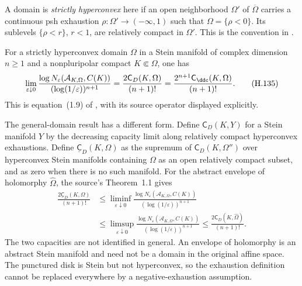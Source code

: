 A domain is \emph{strictly hyperconvex} here if an open
neighborhood $\Omega'$ of $\overline\Omega$ carries a continuous
psh exhaustion $\rho:\Omega'\to(-\infty,1)$ such that
$\Omega=\{\rho<0\}$. Its sublevels $\{\rho<r\}$, $r<1$,
are relatively compact in $\Omega'$. This is the convention in
\cite[Remark~1.2]{Finski26HolomorphicEntropyV1}.

\begin{samepage}
\begin{theorem}\label{thm:appH-holomorphic-entropy}
For a strictly hyperconvex domain $\Omega$ in a Stein manifold
of complex dimension $n\geq1$ and a nonpluripolar compact
$K\Subset\Omega$, one has
\[
 \lim_{\varepsilon\downarrow0}
   \frac{\log N_\varepsilon(\mathcal A_{K,\Omega},C(K))}
        {(\log(1/\varepsilon))^{n+1}}
   =\frac{2\mathsf C_D(K,\Omega)}{(n+1)!}
   =\frac{2^{n+1}\mathsf C_{\ddc}(K,\Omega)}{(n+1)!}.
 \tag{H.135}\label{eq:appH-holomorphic-entropy-limit}
\]
This is equation~(1.9) of
\cite{Finski26HolomorphicEntropyV1}, with its source operator
displayed explicitly.
\end{theorem}
\end{samepage}

The general-domain result has a different form. Define
$\mathsf C_D(K,Y)$ for a Stein manifold $Y$ by the decreasing
capacity limit along relatively compact hyperconvex exhaustions.
Define $\underline{\mathsf C}_D(K,\Omega)$ as the supremum of
$\mathsf C_D(K,\Omega'')$ over hyperconvex Stein manifolds
containing $\Omega$ as an open relatively compact subset, and
as zero when there is no such manifold. For the abstract envelope
of holomorphy $\widehat\Omega$, the source's Theorem~1.1 gives
\[
\begin{aligned}
 \frac{2\underline{\mathsf C}_D(K,\Omega)}{(n+1)!}
 &\leq\liminf_{\varepsilon\downarrow0}
 \frac{\log N_\varepsilon(\mathcal A_{K,\Omega},C(K))}
      {(\log(1/\varepsilon))^{n+1}}\\
 &\leq\limsup_{\varepsilon\downarrow0}
 \frac{\log N_\varepsilon(\mathcal A_{K,\Omega},C(K))}
      {(\log(1/\varepsilon))^{n+1}}
 \leq\frac{2\mathsf C_D(K,\widehat\Omega)}{(n+1)!}.
\end{aligned}
 \tag{H.136}\label{eq:appH-holomorphic-general-bounds}
\]
The two capacities are not identified in general. An envelope
of holomorphy is an abstract Stein manifold and need not be a
domain in the original affine space. The punctured disk is Stein
but not hyperconvex, so the exhaustion definition cannot be
replaced everywhere by a negative-exhaustion assumption.

